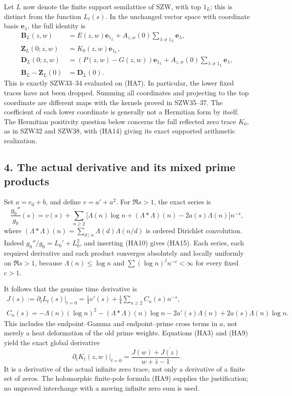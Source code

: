 \documentclass[
  10pt,
  a4paper,
]{article}
\begin{document}
Let \(L\) now denote the finite support semilattice of SZW, with top
\(1_L\); this is distinct from the function \(L_t(s)\). In the unchanged
vector space with coordinate basis \(\mathbf e_\lambda\), the full
identity is \[
\begin{split}
\boldsymbol B_L(z,w)&=E(z,w)\mathbf e_{1_L}
+A_{z,w}(0)\sum_{\lambda\ne1_L}\mathbf e_\lambda,\\
\boldsymbol Z_L(0;z,w)&=K_0(z,w)\mathbf e_{1_L},\\
\boldsymbol D_L(0;z,w)&=(P(z,w)-G(z,w))\mathbf e_{1_L}
+A_{z,w}(0)\sum_{\lambda\ne1_L}\mathbf e_\lambda,\\
\boldsymbol B_L-\boldsymbol Z_L(0)&=\boldsymbol D_L(0).
\end{split}\tag{HA14}
\] This is exactly SZW33--34 evaluated on (HA7). In particular, the
lower fixed traces have not been dropped. Summing all coordinates and
projecting to the top coordinate are different maps with the kernels
proved in SZW35--37. The coefficient of each lower coordinate is
generally not a Hermitian form by itself. The Hermitian positivity
question below concerns the full reflected zero trace \(K_0\), as in
SZW32 and SZW38, with (HA14) giving its exact supported arithmetic
realization.

\subsection{4. The actual derivative and its mixed prime
products}\label{the-actual-derivative-and-its-mixed-prime-products}

Set \(a=e_0+b\), and define \(v=a'+a^2\). For \(\Re s>1\), the exact
series is \[
\frac{g_0''}{g_0}(s)
=v(s)+\sum_{n\ge2}\bigl[\Lambda(n)\log n+(\Lambda*\Lambda)(n)-2a(s)\Lambda(n)\bigr]n^{-s},
\tag{HA15}
\] where \((\Lambda*\Lambda)(n)=\sum_{d\mid n}\Lambda(d)\Lambda(n/d)\)
is ordered Dirichlet convolution. Indeed \(g_0''/g_0=L_0'+L_0^2\), and
inserting (HA10) gives (HA15). Each series, each required derivative and
each product converges absolutely and locally uniformly on \(\Re s>1\),
because \(\Lambda(n)\le\log n\) and \(\sum (\log n)^j n^{-c}<\infty\)
for every fixed \(c>1\).

It follows that the genuine time derivative is \[
\begin{split}
J(s):=\left.\partial_tL_t(s)\right|_{t=0}
=\frac14v'(s)+\frac14\sum_{n\ge2}C_n(s)n^{-s},\\
C_n(s)=-\Lambda(n)(\log n)^2-(\Lambda*\Lambda)(n)\log n
-2a'(s)\Lambda(n)+2a(s)\Lambda(n)\log n.
\end{split}\tag{HA16}
\] This includes the endpoint--Gamma and endpoint--prime cross terms in
\(a\), not merely a heat deformation of the old prime weights. Equations
(HA3) and (HA9) yield the exact global derivative \[
\boxed{\left.\partial_tK_t(z,w)\right|_{t=0}
=\frac{J(w)+\overline{J(z)}}{w+\bar z-1}.}
\tag{HA17}
\] It is a derivative of the actual infinite zero trace, not only a
derivative of a finite set of zeros. The holomorphic finite-pole formula
(HA9) supplies the justification; no unproved interchange with a moving
infinite zero sum is used.
\end{document}
